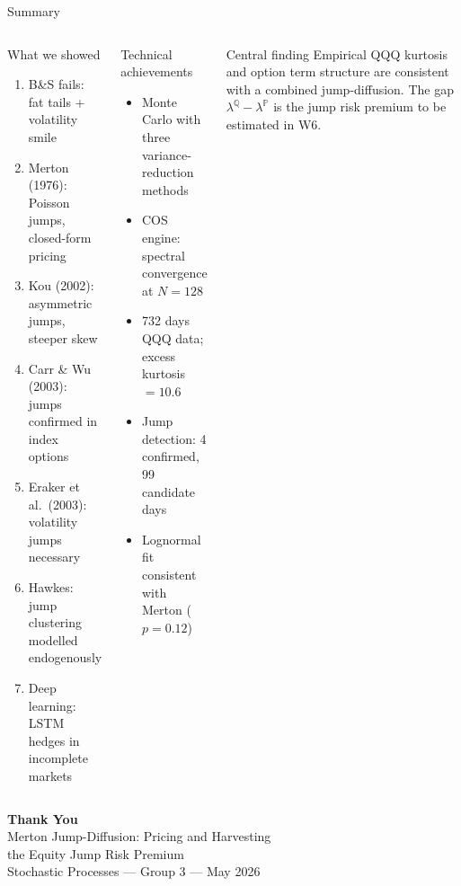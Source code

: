 \documentclass[aspectratio=169,10pt]{beamer}
\begin{document}
\begin{frame}{Summary}
\begin{columns}[T]
\begin{block}{What we showed}
\footnotesize
\begin{enumerate}\itemsep2pt
  \item B\&S fails: fat tails + volatility smile
  \item Merton (1976): Poisson jumps, closed-form pricing
  \item Kou (2002): asymmetric jumps, steeper skew
  \item Carr \& Wu (2003): jumps confirmed in index options
  \item Eraker et al.\ (2003): volatility jumps necessary
  \item Hawkes: jump clustering modelled endogenously
  \item Deep learning: LSTM hedges in incomplete markets
\end{enumerate}
\end{block}

\begin{block}{Technical achievements}
\footnotesize
\begin{itemize}\itemsep2pt
  \item Monte Carlo with three variance-reduction methods
  \item COS engine: spectral convergence at $N=128$
  \item 732 days QQQ data; excess kurtosis $= 10.6$
  \item Jump detection: 4 confirmed, 99 candidate days
  \item Lognormal fit consistent with Merton ($p=0.12$)
\end{itemize}
\end{block}

\begin{alertblock}{Central finding}
\footnotesize Empirical QQQ kurtosis and option term structure are consistent with a combined jump-diffusion. The gap $\lambda^{\mathbb{Q}} - \lambda^{\mathbb{P}}$ is the jump risk premium to be estimated in W6.
\end{alertblock}
\end{columns}
\end{frame}


{
\begin{frame}[plain]
\begin{center}
  \vspace{1.8cm}
  {\Large\bfseries\color{darkblue} Thank You}\\[0.8cm]
  {\normalsize Merton Jump-Diffusion: Pricing and Harvesting\\
   the Equity Jump Risk Premium}\\[0.6cm]
  {\small Stochastic Processes --- Group 3 --- May 2026}
\end{center}
\end{frame}
}
\end{document}
